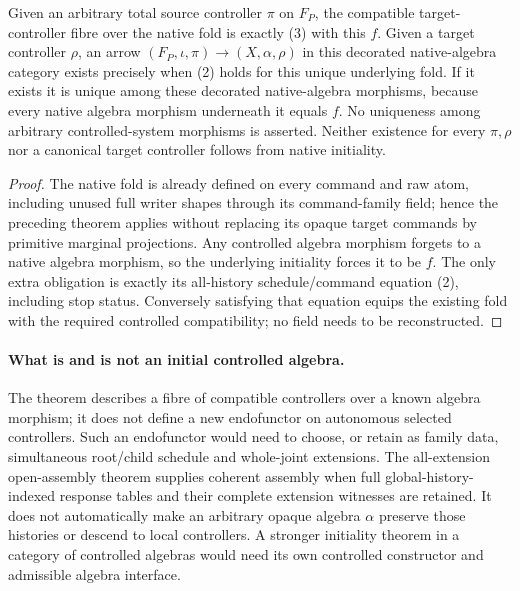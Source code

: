 \documentclass[11pt]{article}
\begin{document}
\begin{theorem}
Given an arbitrary total source controller $\pi$ on $F_P$, the compatible target-controller fibre over the native fold is exactly (3) with this $f$. Given a target controller $\rho$, an arrow $(F_P,\iota,\pi)\to(X,\alpha,\rho)$ in this decorated native-algebra category exists precisely when (2) holds for this unique underlying fold. If it exists it is unique among these decorated native-algebra morphisms, because every native algebra morphism underneath it equals $f$. No uniqueness among arbitrary controlled-system morphisms is asserted. Neither existence for every $\pi,\rho$ nor a canonical target controller follows from native initiality.
\end{theorem}
\begin{proof}
The native fold is already defined on every command and raw atom, including unused full writer shapes through its command-family field; hence the preceding theorem applies without replacing its opaque target commands by primitive marginal projections. Any controlled algebra morphism forgets to a native algebra morphism, so the underlying initiality forces it to be $f$. The only extra obligation is exactly its all-history schedule/command equation (2), including stop status. Conversely satisfying that equation equips the existing fold with the required controlled compatibility; no field needs to be reconstructed.\end{proof}

\paragraph{What is and is not an initial controlled algebra.}
The theorem describes a fibre of compatible controllers over a known algebra morphism; it does not define a new endofunctor on autonomous selected controllers. Such an endofunctor would need to choose, or retain as family data, simultaneous root/child schedule and whole-joint extensions. The all-extension open-assembly theorem supplies coherent assembly when full global-history-indexed response tables and their complete extension witnesses are retained. It does not automatically make an arbitrary opaque algebra $\alpha$ preserve those histories or descend to local controllers. A stronger initiality theorem in a category of controlled algebras would need its own controlled constructor and admissible algebra interface.
\end{document}

